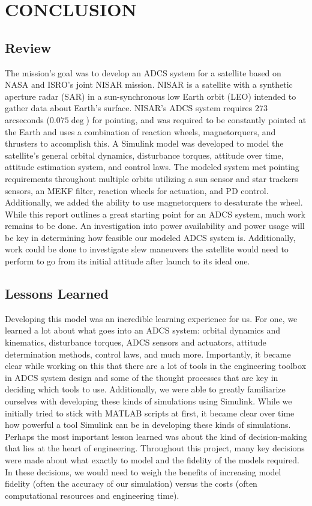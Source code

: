 \section{\Large CONCLUSION}

\subsection{Review}
The mission's goal was to develop an ADCS system for a satellite based on NASA and ISRO's joint NISAR mission. NISAR is a satellite with a synthetic aperture radar (SAR) in a sun-synchronous low Earth orbit (LEO) intended to gather data about Earth's surface. NISAR's ADCS system requires $273$ arcseconds ($0.075 \deg$) for pointing, and was required to be constantly pointed at the Earth and uses a combination of reaction wheels, magnetorquers, and thrusters to accomplish this. A Simulink model was developed to model the satellite's general orbital dynamics, disturbance torques, attitude over time, attitude estimation system, and control laws. The modeled system met pointing requirements throughout multiple orbits utilizing a sun sensor and star trackers sensors, an MEKF filter, reaction wheels for actuation, and PD control. Additionally, we added the ability to use magnetorquers to desaturate the wheel. While this report outlines a great starting point for an ADCS system, much work remains to be done. An investigation into power availability and power usage will be key in determining how feasible our modeled ADCS system is. Additionally, work could be done to investigate slew maneuvers the satellite would need to perform to go from its initial attitude after launch to its ideal one.

\subsection{Lessons Learned}
Developing this model was an incredible learning experience for us. For one, we learned a lot about what goes into an ADCS system: orbital dynamics and kinematics, disturbance torques, ADCS sensors and actuators, attitude determination methods, control laws, and much more. Importantly, it became clear while working on this that there are a lot of tools in the engineering toolbox in ADCS system design and some of the thought processes that are key in deciding which tools to use. Additionally, we were able to greatly familiarize ourselves with developing these kinds of simulations using Simulink. While we initially tried to stick with MATLAB scripts at first, it became clear over time how powerful a tool Simulink can be in developing these kinds of simulations. Perhaps the most important lesson learned was about the kind of decision-making that lies at the heart of engineering. Throughout this project, many key decisions were made about what exactly to model and the fidelity of the models required. In these decisions, we would need to weigh the benefits of increasing model fidelity (often the accuracy of our simulation) versus the costs (often computational resources and engineering time).